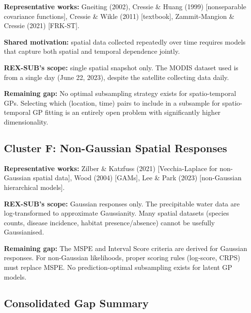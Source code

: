 \documentclass[12pt, a4paper]{article}
\begin{document}
\textbf{Representative works:} Gneiting (2002), Cressie \& Huang (1999)
[nonseparable covariance functions], Cressie \& Wikle (2011) [textbook],
Zammit-Mangion \& Cressie (2021) [FRK-ST].

\textbf{Shared motivation:} spatial data collected repeatedly over time requires
models that capture both spatial and temporal dependence jointly.

\textbf{REX-SUB's scope:} single spatial snapshot only.  The MODIS dataset used is
from a single day (June 22, 2023), despite the satellite collecting data daily.

\begin{warnbox}
  \textbf{Remaining gap:} No optimal subsampling strategy exists for
  spatio-temporal GPs.  Selecting which (location, time) pairs to include in a
  subsample for spatio-temporal GP fitting is an entirely open problem with
  significantly higher dimensionality.
\end{warnbox}

\subsection{Cluster F: Non-Gaussian Spatial Responses}

\textbf{Representative works:} Zilber \& Katzfuss (2021) [Vecchia-Laplace for
non-Gaussian spatial data], Wood (2004) [GAMs], Lee \& Park (2023) [non-Gaussian
hierarchical models].

\textbf{REX-SUB's scope:} Gaussian responses only.  The precipitable water data are
log-transformed to approximate Gaussianity.  Many spatial datasets (species counts,
disease incidence, habitat presence/absence) cannot be usefully Gaussianised.

\begin{warnbox}
  \textbf{Remaining gap:} The MSPE and Interval Score criteria are derived for
  Gaussian responses.  For non-Gaussian likelihoods, proper scoring rules (log-score,
  CRPS) must replace MSPE.  No prediction-optimal subsampling exists for latent GP
  models.
\end{warnbox}

\subsection{Consolidated Gap Summary}
\end{document}
